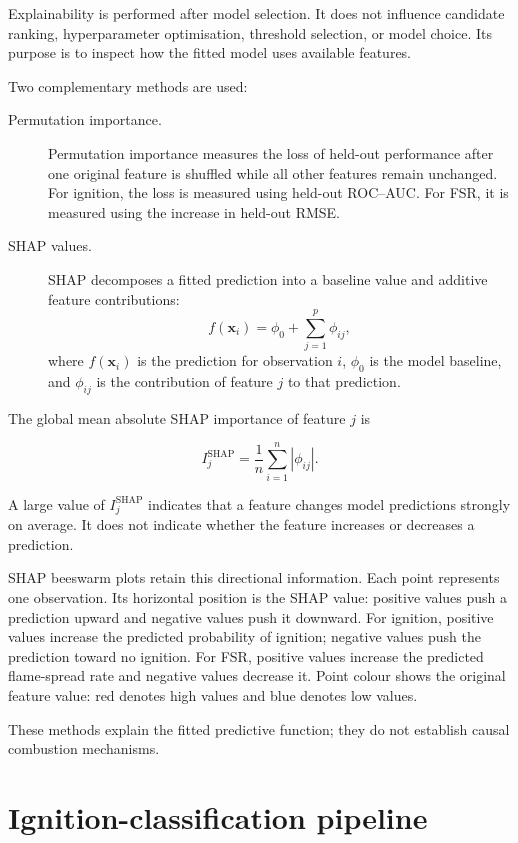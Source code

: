 Explainability is performed after model selection. It does not influence
candidate ranking, hyperparameter optimisation, threshold selection, or model
choice. Its purpose is to inspect how the fitted model uses available features.

Two complementary methods are used:

\begin{description}

  \item[Permutation importance.]
  Permutation importance measures the loss of held-out performance after one
  original feature is shuffled while all other features remain unchanged. For
  ignition, the loss is measured using held-out ROC--AUC. For FSR, it is
  measured using the increase in held-out RMSE.

  \item[SHAP values.]
  SHAP decomposes a fitted prediction into a baseline value and additive feature
  contributions:
  \[
  f(\mathbf{x}_i)
  =
  \phi_0+\sum_{j=1}^{p}\phi_{ij},
  \]
  where \(f(\mathbf{x}_i)\) is the prediction for observation \(i\),
  \(\phi_0\) is the model baseline, and \(\phi_{ij}\) is the contribution of
  feature \(j\) to that prediction.
\end{description}

The global mean absolute SHAP importance of feature \(j\) is

\[
I^{\mathrm{SHAP}}_j
=
\frac{1}{n}\sum_{i=1}^{n}|\phi_{ij}|.
\]

A large value of \(I^{\mathrm{SHAP}}_j\) indicates that a feature changes model
predictions strongly on average. It does not indicate whether the feature
increases or decreases a prediction.

SHAP beeswarm plots retain this directional information. Each point represents
one observation. Its horizontal position is the SHAP value: positive values
push a prediction upward and negative values push it downward. For ignition,
positive values increase the predicted probability of ignition; negative values
push the prediction toward no ignition. For FSR, positive values increase the
predicted flame-spread rate and negative values decrease it. Point colour shows
the original feature value: red denotes high values and blue denotes low values.

These methods explain the fitted predictive function; they do not establish
causal combustion mechanisms.

\section{Ignition-classification pipeline}
\label{sec:classification-method}

